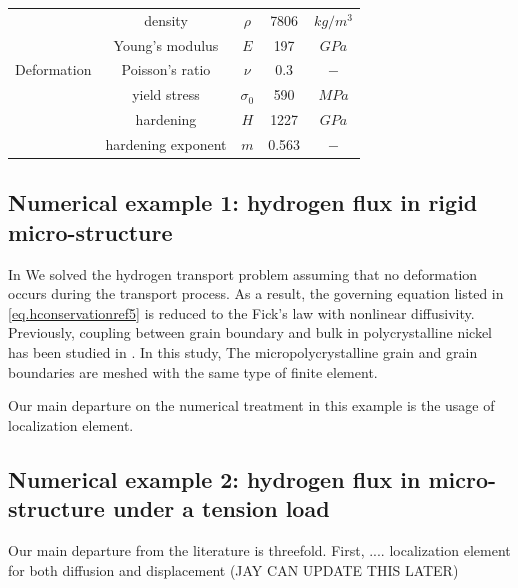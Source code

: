 \documentclass[10pt]{elsarticle}
\begin{document}
\begin{table}[h!]
\begin{center}
\begin{tabular}{|c|c|c|c|c|}
\cline{2-5}
\hline \multirow{5}{*}{Deformation}
&density &$\rho$ &7806 &$kg/m^{3}$ \\
\cline{2-5}
&Young's modulus &$E$ &197 &$G\!Pa$ \\
\cline{2-5}
&Poisson's ratio &$\nu$ &0.3 &$-$ \\
\cline{2-5}
&yield stress &$\sigma_{0}$ &590 &$M\!Pa$\\
\cline{2-5}
&hardening &$H$ &1227 &$G\!Pa$\\
\cline{2-5}
&hardening exponent &$m$ &0.563 &$-$\\
\cline{2-5}
\hline
\end{tabular}
\end{center}
\end{table}

\subsection{Numerical example 1: hydrogen flux in rigid micro-structure}
In We solved the hydrogen transport problem assuming that no deformation 
occurs during the transport process. As a result, the governing equation listed in \eqref{eq.hconservationref5} is reduced to the Fick's law with nonlinear diffusivity. 
Previously, coupling between grain boundary and bulk in polycrystalline nickel has been studied in
\citet{Jothi:2013}. In this study, The micropolycrystalline grain and grain boundaries are meshed with the same type of finite element.

Our main departure on the numerical treatment in this example is the usage of localization element.  

\subsection{Numerical example 2: hydrogen flux in micro-structure under a tension load}


Our main departure from the literature is threefold. First, .... localization element for both diffusion and displacement (JAY CAN UPDATE THIS LATER)
\end{document}
